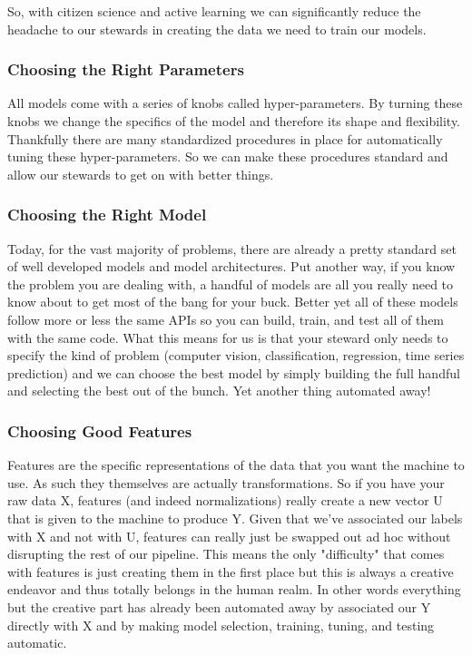 \documentclass[10pt,a5paper]{book}
\begin{document}
So, with citizen science and active learning we can significantly reduce the headache to our stewards in creating the data we need to train our models. 

\subsubsection{Choosing the Right Parameters}
All models come with a series of knobs called hyper-parameters. By turning these knobs we change the specifics of the model and therefore its shape and flexibility. Thankfully there are many standardized procedures in place for automatically tuning these hyper-parameters. So we can make these procedures standard and allow our stewards to get on with better things.

\subsubsection{Choosing the Right Model}
Today, for the vast majority of problems, there are already a pretty standard set of well developed models and model architectures. Put another way, if you know the problem you are dealing with, a handful of models are all you really need to know about to get most of the bang for your buck. Better yet all of these models follow more or less the same APIs so you can build, train, and test all of them with the same code. What this means for us is that your steward only needs to specify the kind of problem (computer vision, classification, regression, time series prediction) and we can choose the best model by simply building the full handful and selecting the best out of the bunch. Yet another thing automated away!

\subsubsection{Choosing Good Features}
Features are the specific representations of the data that you want the machine to use. As such they themselves are actually transformations. So if you have your raw data X, features (and indeed normalizations) really create a new vector U  that is given to the machine to produce Y. Given that we've associated our labels with X and not with U, features can really just be swapped out ad hoc without disrupting the rest of our pipeline. This means the only "difficulty" that comes with features is just creating them in the first place but this is always a creative endeavor and thus totally belongs in the human realm. In other words everything but the creative part has already been automated away by associated our Y directly with X and by making model selection, training, tuning, and testing automatic. 
\end{document}
